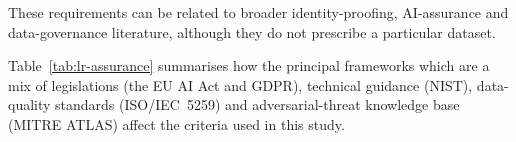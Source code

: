 These requirements can be related to broader identity-proofing, AI-assurance and data-governance literature, although they do not prescribe a particular dataset. 

Table~\ref{tab:lr-assurance} summarises how the principal frameworks which are a mix of legislations (the EU AI Act and GDPR), technical guidance (NIST), data-quality standards (ISO/IEC~5259) and adversarial-threat knowledge base (MITRE ATLAS) affect the criteria used in this study. 







